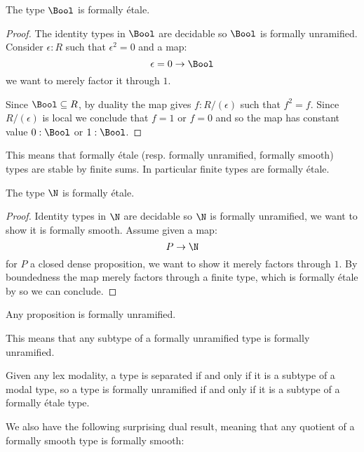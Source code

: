 \begin{proposition}\label{bool-is-etale}
  The type $\Bool$ is formally étale.
\end{proposition}

\begin{proof}
The identity types in $\Bool$ are decidable so $\Bool$ is formally unramified. Consider $\epsilon:R$ such that $\epsilon^2=0$ and a map:
\[\epsilon=0 \to \Bool\]
we want to merely factor it through $1$.

 Since $\Bool\subseteq R$, by duality the map gives $f:R/(\epsilon)$ such that $f^2=f$. Since $R/(\epsilon)$ is local we conclude that $f = 1$ or $f=0$ and so the map has constant value $0:\Bool$ or $1:\Bool$.
\end{proof}

\begin{remark}\label{finite-are-etale}
This means that formally étale (resp. formally unramified, formally smooth) types are stable by finite sums. In particular finite types are formally étale.
\end{remark}

\begin{proposition}
The type $\N$ is formally étale.
\end{proposition}

\begin{proof}
Identity types in $\N$ are decidable so $\N$ is formally unramified, we want to show it is formally smooth. Assume given a map:
\[P\to \N\]
for $P$ a closed dense proposition, we want to show it merely factors through $1$. By boundedness the map merely factors through a finite type, which is formally étale by  so we can conclude.
\end{proof}

\begin{lemma}\label{prop-are-unramified}
Any proposition is formally unramified.
\end{lemma}

This means that any subtype of a formally unramified type is formally unramified.

\begin{remark}
  Given any lex modality, a type is separated if and only if it is a subtype of a modal type,
  so a type is formally unramified if and only if it is a subtype of a formally étale type.
\end{remark}

We also have the following surprising dual result, meaning that any quotient of a formally smooth type is formally smooth:

